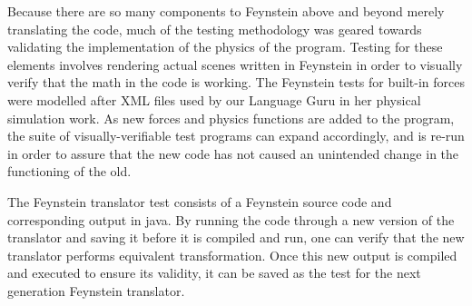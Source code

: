 Because there are so many components to Feynstein above and beyond
merely translating the code, much of the testing methodology was
geared towards validating the implementation of the physics of the
program. Testing for these elements involves rendering actual scenes
written in Feynstein in order to visually verify that the math in the
code is working. The Feynstein tests for built-in forces were modelled
after XML files used by our Language Guru in her physical simulation
work. As new forces and physics functions are added to the program,
the suite of visually-verifiable test programs can expand accordingly,
and is re-run in order to assure that the new code has not caused an
unintended change in the functioning of the old.

The Feynstein translator test consists of a Feynstein source code and
corresponding output in java. By running the code through a new
version of the translator and saving it before it is compiled and run,
one can verify that the new translator performs equivalent
transformation. Once this new output is compiled and executed to
ensure its validity, it can be saved as the test for the next
generation Feynstein translator.
